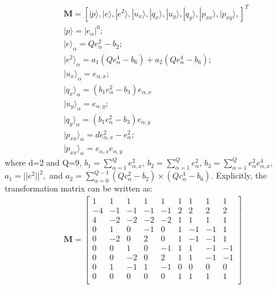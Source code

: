 \begin{align}
 & \mathbf{M}=\left[|p\rangle,|e\rangle,|e^2\rangle,|u_x\rangle,|q_x\rangle,|u_y\rangle,|q_y\rangle,|p_{xx}\rangle,|p_{xy}\rangle,\right]^T \\
 & |p\rangle = |\textit{e}_{\alpha}|^0;\\
 & |e\rangle_{\alpha}=\textit{Q}e_{\alpha}^2-b_2;\\
 & |e^2\rangle_{\alpha}=a_1(\textit{Q}e_{\alpha}^4-b_6)+a_2(\textit{Q}e_{\alpha}^4-b_6);\\
 & |u_x\rangle_{\alpha}=e_{\alpha,x}; \\
 & |q_x\rangle_{\alpha}=(\textit{b}_1e_{\alpha}^2-b_3)e_{\alpha,x}\\
 & |u_y\rangle_{\alpha}=e_{\alpha,y}; \\
 & |q_y\rangle_{\alpha}=(\textit{b}_1e_{\alpha}^2-b_3)e_{\alpha,y}\\
 & |p_{xx}\rangle_{\alpha}=\textit{d}e_{\alpha,x}^2-e_{\alpha}^2; \\
 & |p_{xx}\rangle_{\alpha}=e_{\alpha,x}e_{\alpha,y}
\end{align}
\flushleft where d=2 and Q=9, $b_1=\sum_{\alpha=1}^{Q}e_{\alpha,x}^2$, $b_2=\sum_{\alpha=1}^{Q}e_{\alpha}^2$, 
$b_3=\sum_{\alpha=1}^{Q}e_{\alpha}^2e_{\alpha,x}^4$, $a_1=||e^2||^2,$ and $a_2=\sum_{\alpha=0}^{Q-1}(Qc_{\alpha}^2-b_2)\times(Qc_{\alpha}^4-b_6)$. Explicitly, the transformation matrix can be written as:
\begin{align}
\mathbf{M}= \begin{bmatrix}
 1 &  1 &  1 &  1 &  1 &  1 &  1 &  1 &  1 \\
-4 & -1 & -1 & -1 & -1 &  2 &  2 &  2 &  2 \\ 
 4 & -2 & -2 & -2 & -2 &  1 &  1 &  1 &  1 \\
 0 &  1 &  0 & -1 &  0 &  1 & -1 & -1 &  1 \\
 0 & -2 &  0 &  2 &  0 &  1 & -1 & -1 &  1 \\
 0 &  0 &  1 &  0 & -1 &  1 &  1 & -1 & -1 \\
 0 &  0 & -2 &  0 &  2 &  1 &  1 & -1 & -1 \\
 0 &  1 & -1 &  1 & -1 &  0 &  0 &  0 &  0 \\
 0 &  0 &  0 &  0 &  0 &  1 &  1 &  1 &  1 \\
\end{bmatrix}
\end{align}
 
